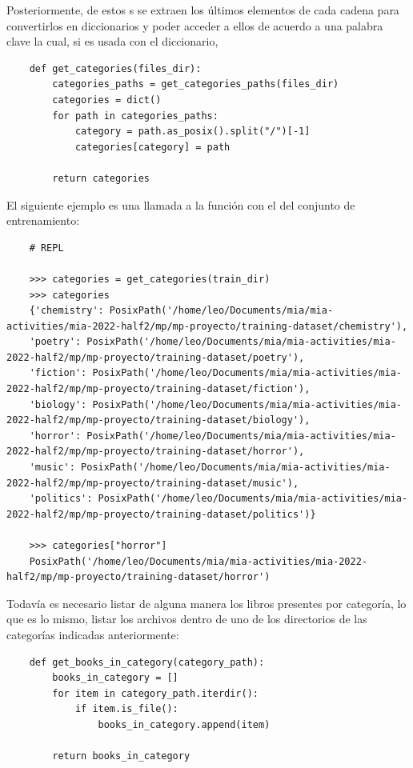 Posteriormente, de estos s se extraen los últimos elementos de cada cadena para convertirlos en diccionarios y poder acceder a ellos de acuerdo a una palabra clave la cual, si es usada con el diccionario, 
\begin{verbatim}
    def get_categories(files_dir):
        categories_paths = get_categories_paths(files_dir)
        categories = dict()
        for path in categories_paths:
            category = path.as_posix().split("/")[-1]
            categories[category] = path
            
        return categories
\end{verbatim}

El siguiente ejemplo es una llamada a la función  con el  del conjunto de entrenamiento:
\begin{verbatim}
    # REPL

    >>> categories = get_categories(train_dir)
    >>> categories
    {'chemistry': PosixPath('/home/leo/Documents/mia/mia-activities/mia-2022-half2/mp/mp-proyecto/training-dataset/chemistry'),
    'poetry': PosixPath('/home/leo/Documents/mia/mia-activities/mia-2022-half2/mp/mp-proyecto/training-dataset/poetry'),
    'fiction': PosixPath('/home/leo/Documents/mia/mia-activities/mia-2022-half2/mp/mp-proyecto/training-dataset/fiction'),
    'biology': PosixPath('/home/leo/Documents/mia/mia-activities/mia-2022-half2/mp/mp-proyecto/training-dataset/biology'),
    'horror': PosixPath('/home/leo/Documents/mia/mia-activities/mia-2022-half2/mp/mp-proyecto/training-dataset/horror'),
    'music': PosixPath('/home/leo/Documents/mia/mia-activities/mia-2022-half2/mp/mp-proyecto/training-dataset/music'),
    'politics': PosixPath('/home/leo/Documents/mia/mia-activities/mia-2022-half2/mp/mp-proyecto/training-dataset/politics')}
    
    >>> categories["horror"]
    PosixPath('/home/leo/Documents/mia/mia-activities/mia-2022-half2/mp/mp-proyecto/training-dataset/horror')
\end{verbatim}

Todavía es necesario listar de alguna manera los libros presentes por categoría, lo que es lo mismo, listar los archivos dentro de uno de los directorios de las categorías indicadas anteriormente:
\begin{verbatim}
    def get_books_in_category(category_path):
        books_in_category = []
        for item in category_path.iterdir():
            if item.is_file():
                books_in_category.append(item)
                
        return books_in_category
\end{verbatim}

